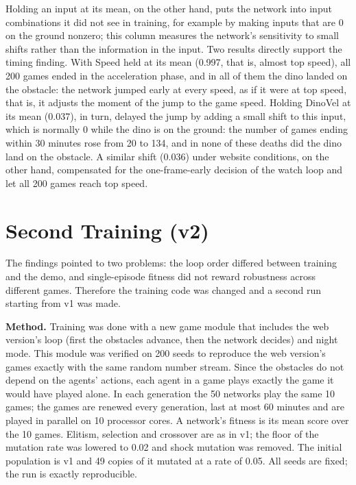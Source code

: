 \documentclass[11pt,a4paper]{article}
\begin{document}
Holding an input at its mean, on the other hand, puts the network into input combinations it did not see in training, for example by making inputs that are 0 on the ground nonzero; this column measures the network's sensitivity to small shifts rather than the information in the input. Two results directly support the timing finding. With Speed held at its mean (0.997, that is, almost top speed), all 200 games ended in the acceleration phase, and in all of them the dino landed on the obstacle: the network jumped early at every speed, as if it were at top speed, that is, it adjusts the moment of the jump to the game speed. Holding DinoVel at its mean (0.037), in turn, delayed the jump by adding a small shift to this input, which is normally 0 while the dino is on the ground: the number of games ending within 30 minutes rose from 20 to 134, and in none of these deaths did the dino land on the obstacle. A similar shift (0.036) under website conditions, on the other hand, compensated for the one-frame-early decision of the watch loop and let all 200 games reach top speed.

\section{Second Training (v2)}
\label{sec:v2}

The findings pointed to two problems: the loop order differed between training and the demo, and single-episode fitness did not reward robustness across different games. Therefore the training code was changed and a second run starting from v1 was made.

\textbf{Method.} Training was done with a new game module that includes the web version's loop (first the obstacles advance, then the network decides) and night mode. This module was verified on 200 seeds to reproduce the web version's games exactly with the same random number stream. Since the obstacles do not depend on the agents' actions, each agent in a game plays exactly the game it would have played alone. In each generation the 50 networks play the same 10 games; the games are renewed every generation, last at most 60 minutes and are played in parallel on 10 processor cores. A network's fitness is its mean score over the 10 games. Elitism, selection and crossover are as in v1; the floor of the mutation rate was lowered to 0.02 and shock mutation was removed. The initial population is v1 and 49 copies of it mutated at a rate of 0.05. All seeds are fixed; the run is exactly reproducible.
\end{document}

